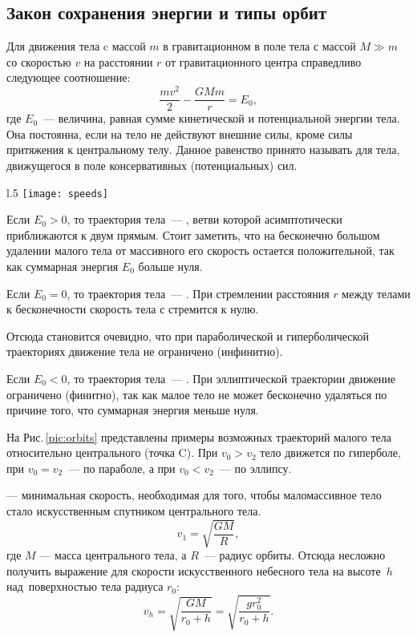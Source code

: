 \subsection{Закон сохранения энергии и типы орбит}
Для движения тела c массой $m$ в гравитационном  в поле тела
с массой \linebreak $M\gg m$ со скоростью $v$ на расстоянии $r$ от
гравитационного центра справедливо следующее соотношение:
\begin{equation}
	\frac{m v^2}{2}-\frac{GM m }{r}=E_0,
\end{equation}
где $E_0$~--- величина, равная сумме кинетической и потенциальной энергии тела. Она постоянна, если на тело не действуют внешние силы, кроме силы притяжения к центральному телу. Данное равенство принято называть  для тела, движущегося в поле консервативных (потенциальных) сил.

\begin{wrapfigure}[10]{l}{.5\tw}
	\centering
	\vspace{-1pc}
	\texttt{[image: speeds]}
	\caption{Возможные траектории тела \label{pic:orbits}}
\end{wrapfigure}
Если $E_0>0$, то траектория тела~--- ,
ветви которой асимптотически приближаются к двум прямым. Стоит заметить,
что на бесконечно большом удалении малого \linebreak тела от массивного
его скорость остается положительной, так как суммарная энергия $E_0$
больше нуля.

Если $E_0=0$, то траектория тела~--- . При стремлении
расстояния $r$ между телами к бесконечности скорость тела с стремится к нулю.

Отсюда становится очевидно, что при параболической и гиперболической
траекториях движение тела не ограничено (инфинитно).

Если $E_0<0$, то траектория тела~--- . При
эллиптической траектории движение ограничено (финитно), так как малое тело
не может бесконечно удаляться по причине того,
что суммарная энергия меньше нуля.

На Рис.\,\ref{pic:orbits} представлены примеры возможных траекторий малого тела
относительно центрального (точка C). При $v_0 > v_{2}$ тело движется
по гиперболе, при $v_0 = v_{2}$~--- по параболе,
а при $v_0 < v_{2}$~--- по эллипсу.

 --- минимальная скорость, необходимая для
того, чтобы маломассивное тело стало искусственным спутником центрального тела.
\begin{equation}v_1=\sqrt{\frac{GM}{R}},
\end{equation}
где $M$ --- масса центрального тела, а $R$~--- радиус орбиты. Отсюда несложно получить выражение для
скорости искусственного небесного тела на высоте~$h$ над~поверхностью тела радиуса $r_0$:
\begin{equation}
	v_h=\sqrt{\frac{GM}{r_0+h}}=\sqrt{\frac{g r_0^2}{r_0+h}}.
\end{equation}

